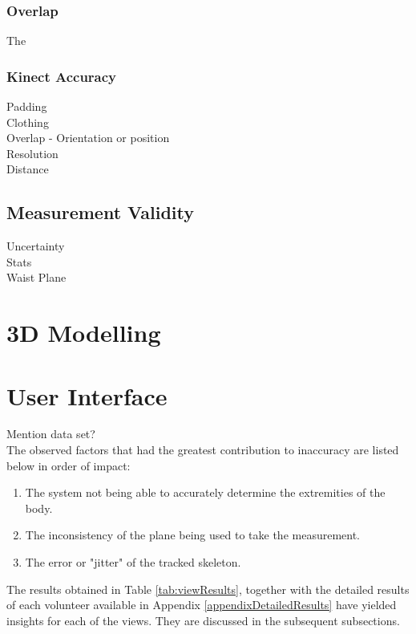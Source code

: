 \subsubsection{Overlap}
The 

\subsubsection{Kinect Accuracy}


Padding\\
Clothing\\
Overlap - Orientation or position\\
Resolution\\
Distance\\

\subsection{Measurement Validity}
Uncertainty\\
Stats\\
Waist Plane\\

\section{3D Modelling}

\section{User Interface}

\iffalse

Mention data set?\\

The observed factors that had the greatest contribution to inaccuracy are listed below in order of impact:

\begin{enumerate}
	\item The system not being able to accurately determine the extremities of the body.
	\item The inconsistency of the plane being used to take the measurement.
	\item The error or "jitter" of the tracked skeleton.
\end{enumerate}



The results obtained in Table \ref{tab:viewResults}, together with the detailed results of each volunteer available in Appendix \ref{appendixDetailedResults} have yielded insights for each of the views. They are discussed in the subsequent subsections. 


